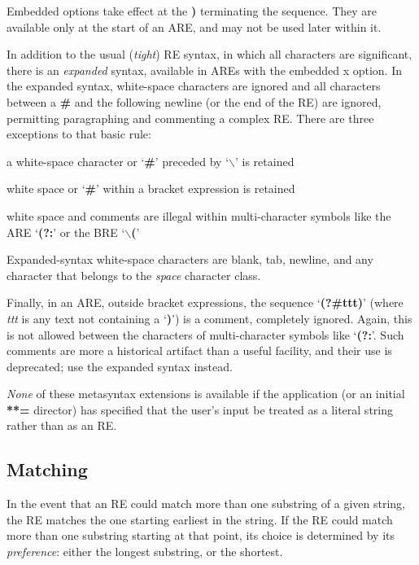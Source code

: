 Embedded options take effect at the {\bf )} terminating the
sequence. They are available only at the start of an ARE, and may not be
used later within it. 

In addition to the usual ({\it tight}) RE syntax, in which
all characters are significant, there is an {\it expanded} syntax, available
in AREs with the embedded
x option. In the expanded syntax, white-space characters are ignored and
all characters between a {\bf \#} and the following newline (or the end of the
RE) are ignored, permitting paragraphing and commenting a complex RE. There
are three exceptions to that basic rule:
{\itemize
\item%
a white-space character or `{\bf \#}' preceded
by `{\bf $\backslash$}' is retained 
\item%
white space or `{\bf \#}' within a bracket expression is retained
\item%
white space and comments are illegal within multi-character symbols like
the ARE `{\bf (?:}' or the BRE `{\bf $\backslash$(}' 
}
Expanded-syntax white-space characters are blank,
tab, newline, and any character that belongs to the {\it space} character class.

Finally, in an ARE, outside bracket expressions, the sequence `{\bf (?\#ttt)}' (where
 {\it ttt} is any text not containing a `{\bf )}') is a comment, completely ignored. Again,
this is not allowed between the characters of multi-character symbols like
`{\bf (?:}'. Such comments are more a historical artifact than a useful facility,
and their use is deprecated; use the expanded syntax instead. 

{\it None} of these
metasyntax extensions is available if the application (or an initial {\bf ***=}
director) has specified that the user's input be treated as a literal string
rather than as an RE. 


\subsection{Matching}\label{wxresynmatching}


In the event that an RE could match more than
one substring of a given string, the RE matches the one starting earliest
in the string. If the RE could match more than one substring starting at
that point, its choice is determined by its {\it preference}: either the longest
substring, or the shortest. 

